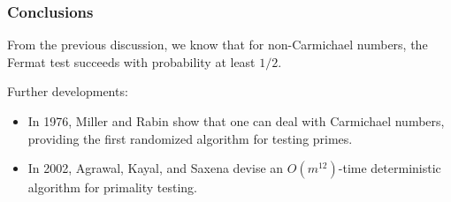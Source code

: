 \begin{frame}\frametitle{Conclusions}
  From the previous discussion, we know that for non-Carmichael
  numbers, the Fermat test succeeds with probability at least $1/2$.

  Further developments:
  \begin{itemize}
  \item In 1976, Miller and Rabin show that one can deal with
    Carmichael numbers, providing the first randomized algorithm for
    testing primes.
  \item In 2002, Agrawal, Kayal, and Saxena devise an $O(m^{12})$-time
    deterministic algorithm for primality testing.
  \end{itemize}
\end{frame}
